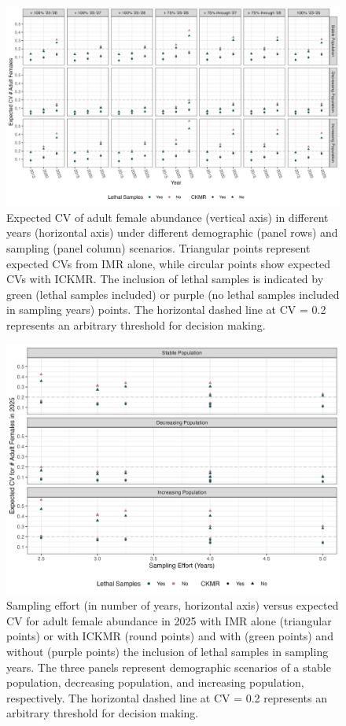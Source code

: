 \begin{figure}
\includegraphics[scale=0.7]{../figures/MegaResults}

\caption{Expected CV of adult female abundance (vertical axis) in different
years (horizontal axis) under different demographic (panel rows) and
sampling (panel column) scenarios. Triangular points represent expected
CVs from IMR alone, while circular points show expected CVs with ICKMR.
The inclusion of lethal samples is indicated by green (lethal samples
included) or purple (no lethal samples included in sampling years)
points. The horizontal dashed line at CV = 0.2 represents an arbitrary
threshold for decision making.\label{fig:megaCV}}
\end{figure}

\begin{figure}
\includegraphics[scale=0.7]{../figures/EffortVCV}

\caption{Sampling effort (in number of years, horizontal axis) versus expected
CV for adult female abundance in 2025 with IMR alone (triangular points)
or with ICKMR (round points) and with (green points) and without (purple
points) the inclusion of lethal samples in sampling years. The three
panels represent demographic scenarios of a stable population, decreasing
population, and increasing population, respectively. The horizontal
dashed line at CV = 0.2 represents an arbitrary threshold for decision
making.\label{fig:effVcv}}
\end{figure}

